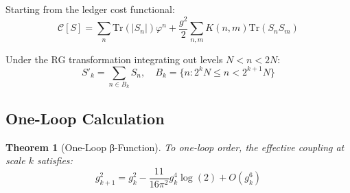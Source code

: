 \documentclass[11pt]{article}
\numberwithin{equation}{section}
\newtheorem{theorem}{Theorem}[section]
\theoremstyle{definition}
\theoremstyle{remark}
\begin{document}
Starting from the ledger cost functional:
\begin{equation}
\mathcal{C}[S] = \sum_n \text{Tr}(|S_n|) \varphi^n + \frac{g^2}{2} \sum_{n,m} K(n,m) \text{Tr}(S_n S_m)
\end{equation}

Under the RG transformation integrating out levels $N < n < 2N$:
\begin{equation}
S'_k = \sum_{n \in B_k} S_n, \quad B_k = \{n : 2^k N \leq n < 2^{k+1} N\}
\end{equation}

\subsection{One-Loop Calculation}

\begin{theorem}[One-Loop β-Function]
To one-loop order, the effective coupling at scale $k$ satisfies:
\begin{equation}
g_{k+1}^2 = g_k^2 - \frac{11}{16\pi^2} g_k^4 \log(2) + O(g_k^6)
\end{equation}
\end{theorem}
\end{document}
